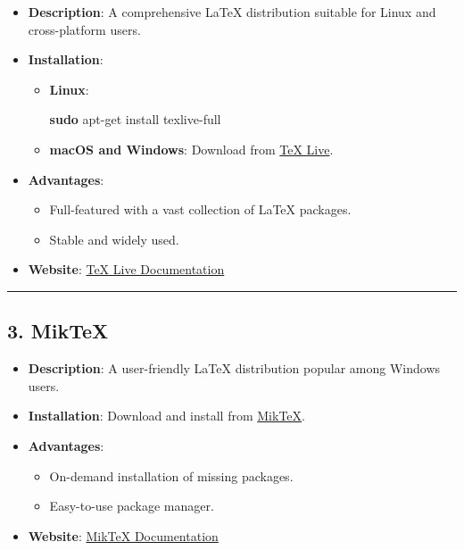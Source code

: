 \documentclass[
]{book}
\newenvironment{Shaded}{\begin{snugshade}}{\end{snugshade}}
\newcommand{\FunctionTok}[1]{\textcolor[rgb]{0.13,0.29,0.53}{\textbf{#1}}}
\newcommand{\NormalTok}[1]{#1}
\providecommand{\tightlist}{%
  \setlength{\itemsep}{0pt}\setlength{\parskip}{0pt}}
\theoremstyle{definition}
\theoremstyle{definition}
\theoremstyle{definition}
\theoremstyle{definition}
\theoremstyle{remark}
\begin{document}
\begin{itemize}
\tightlist
\item
  \textbf{Description}: A comprehensive LaTeX distribution suitable for Linux and cross-platform users.
\item
  \textbf{Installation}:

  \begin{itemize}
  \item
    \textbf{Linux}:

\begin{Shaded}
\begin{Highlighting}[]
\FunctionTok{sudo}\NormalTok{ apt{-}get install texlive{-}full}
\end{Highlighting}
\end{Shaded}
  \item
    \textbf{macOS and Windows}: Download from \href{https://www.tug.org/texlive/}{TeX Live}.
  \end{itemize}
\item
  \textbf{Advantages}:

  \begin{itemize}
  \tightlist
  \item
    Full-featured with a vast collection of LaTeX packages.
  \item
    Stable and widely used.
  \end{itemize}
\item
  \textbf{Website}: \href{https://www.tug.org/texlive/}{TeX Live Documentation}
\end{itemize}

\begin{center}\rule{0.5\linewidth}{0.5pt}\end{center}

\subsection{\texorpdfstring{3. \textbf{MikTeX}}{3. MikTeX}}\label{miktex}

\begin{itemize}
\tightlist
\item
  \textbf{Description}: A user-friendly LaTeX distribution popular among Windows users.
\item
  \textbf{Installation}: Download and install from \href{https://miktex.org/}{MikTeX}.
\item
  \textbf{Advantages}:

  \begin{itemize}
  \tightlist
  \item
    On-demand installation of missing packages.
  \item
    Easy-to-use package manager.
  \end{itemize}
\item
  \textbf{Website}: \href{https://miktex.org/}{MikTeX Documentation}
\end{itemize}
\end{document}
